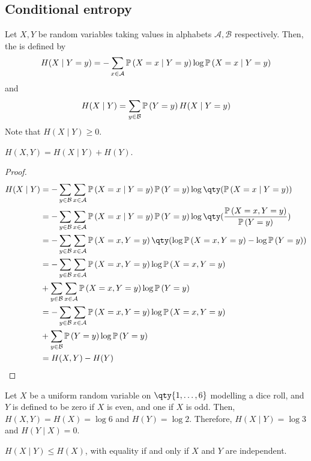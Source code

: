 \subsection{Conditional entropy}
\begin{definition}
    Let $X, Y$ be random variables taking values in alphabets $\mathcal A, \mathcal B$ respectively.
    Then, the  is defined by
    \[ H(X \mid Y = y) = - \sum_{x \in \mathcal A} \mathbb{P}\left({X = x \mid Y = y}\right) \log \mathbb{P}\left({X = x \mid Y = y}\right) \]
    and
    \[ H(X \mid Y) = \sum_{y \in \mathcal B} \mathbb{P}\left({Y = y}\right) H(X \mid Y = y) \]
    Note that $H(X \mid Y) \geq 0$.
\end{definition}
\begin{lemma}
    $H(X,Y) = H(X \mid Y) + H(Y)$.
\end{lemma}
\begin{proof}
    \begin{align*}
        H(X \mid Y) &= -\sum_{y \in \mathcal B} \sum_{x \in \mathcal A} \prob{X = x \mid Y = y} \prob{Y = y} \log \qty(\prob{X = x \mid Y = y}) \\
        &= -\sum_{y \in \mathcal B} \sum_{x \in \mathcal A} \prob{X = x \mid Y = y} \prob{Y = y} \log \qty(\frac{\prob{X = x, Y = y}}{\prob{Y = y}}) \\
        &= -\sum_{y \in \mathcal B} \sum_{x \in \mathcal A} \prob{X = x, Y = y} \qty(\log \prob{X = x, Y = y} - \log \prob{Y = y}) \\
        &= -\sum_{y \in \mathcal B} \sum_{x \in \mathcal A} \prob{X = x, Y = y} \log \prob{X = x, Y = y} \\
        &+ \sum_{y \in \mathcal B} \sum_{x \in \mathcal A} \prob{X = x, Y = y} \log \prob{Y = y} \\
        &= -\sum_{y \in \mathcal B} \sum_{x \in \mathcal A} \prob{X = x, Y = y} \log \prob{X = x, Y = y} \\
        &+ \sum_{y \in \mathcal B} \prob{Y = y} \log \prob{Y = y} \\
        &= H(X,Y) - H(Y)
    \end{align*}
\end{proof}
\begin{example}
    Let $X$ be a uniform random variable on $\qty{1, \dots, 6}$ modelling a dice roll, and $Y$ is defined to be zero if $X$ is even, and one if $X$ is odd.
    Then, $H(X,Y) = H(X) = \log 6$ and $H(Y) = \log 2$.
    Therefore, $H(X \mid Y) = \log 3$ and $H(Y \mid X) = 0$.
\end{example}
\begin{corollary}
    $H(X\mid Y) \leq H(X)$, with equality if and only if $X$ and $Y$ are independent.
\end{corollary}
